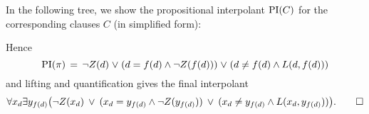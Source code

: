 \begin{exa}
{\begin{adjustwidth}{6.2em}{0em}
\begin{prooftree}

				\RightLabelm{\resrule{\resrulefac}{\id}}


				\insertBetweenHyps{\hskip -9em}


				\insertBetweenHyps{\hskip -10em}

				\RightLabelm{\resrule{\resruleres}{\id}}
				\BinaryInfCm{  \square }
			\end{prooftree}
		\end{adjustwidth}
		~

		~
	}

	In the following tree, we show the propositional interpolant $\operatorname{PI}(C)$ for the corresponding clauses $C$ (in simplified form):
	{
		\def\defaultHypSeparation{\hskip 4.4em}
		\begin{prooftree}

			\AxiomCm{ \top  }

			\AxiomCm{ \bot}
			\AxiomCm{ \top }

			\AxiomCm{ \bot}
			\AxiomCm{ \top }


			\AxiomCm{ \bot }


		\end{prooftree}
	}


	\noindent
	Hence
	\[\operatorname{PI}(\pi) \;\,{=}\;\,  \lnot Z(d) \;{\lor}\;  (d = f(d) \land \lnot Z(f(d)) ) \;{\lor}\; (d \neq f(d) \land L(d, f(d))) \]
	and lifting and quantification gives the final interpolant
	\[ \forall x_d \exists y_{f(d)} \big( \lnot Z(x_d) \;\,{\lor}\;\,  (x_d = y_{f(d)} \land \lnot Z(y_{f(d)}) ) \;\,{\lor}\;\, (x_d \neq y_{f(d)} \land L(x_d, y_{f(d)})) \big).
	\qedhere
\]
\end{exa}


